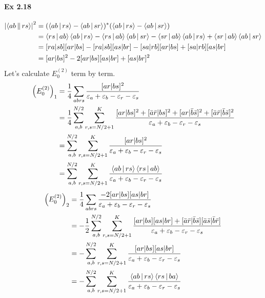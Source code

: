 \documentclass[a4paper]{article}
\newcommand{\ex}[1]{\paragraph{Ex #1}}
\numberwithin{equation}{subsection}
\begin{document}
\ex{2.18}
\begin{equation}\label{key}
\begin{aligned}
\abs{\Braket{ab||rs}}^2 &= (\Braket{ab|rs} - \Braket{ab|sr})^*(\Braket{ab|rs} - \Braket{ab|sr})\\
&= \Braket{rs|ab}\Braket{ab|rs} - \Braket{rs|ab}\Braket{ab|sr} - \Braket{sr|ab}\Braket{ab|rs} + \Braket{sr|ab}\Braket{ab|sr}\\
&= [ra|sb][ar|bs] - [ra|sb][as|br] - [sa|rb][ar|bs] + [sa|rb][as|br]\\
&= [ar|bs]^2 - 2[ar|bs][as|br] + [as|br]^2
\end{aligned}
\end{equation}
Let's calculate $ E_0^{(2)} $ term by term.
\begin{equation}\label{key}
\begin{aligned}
\qty(E_0^{(2)})_1 &= \dfrac{1}{4}\sum_{abrs} \dfrac{[ar|bs]^2}{\varepsilon_a+\varepsilon_b-\varepsilon_r-\varepsilon_s}\\
&= \dfrac{1}{4}\sum_{a,b}^{N/2}\sum_{r,s=N/2+1}^K \dfrac{[ar|bs]^2 +[\bar{a}\bar{r}|bs]^2 + [ar|\bar{b}\bar{s}]^2 +[\bar{a}\bar{r}|\bar{b}\bar{s}]^2}{\varepsilon_a+\varepsilon_b-\varepsilon_r-\varepsilon_s}\\
&= \sum_{a,b}^{N/2}\sum_{r,s=N/2+1}^K \dfrac{[ar|bs]^2}{\varepsilon_a+\varepsilon_b-\varepsilon_r-\varepsilon_s}\\
&= \sum_{a,b}^{N/2}\sum_{r,s=N/2+1}^K \dfrac{\Braket{ab|rs}\Braket{rs|ab}}{\varepsilon_a+\varepsilon_b-\varepsilon_r-\varepsilon_s}
\end{aligned}
\end{equation}
\begin{equation}\label{key}
\begin{aligned}
\qty(E_0^{(2)})_2 &= \dfrac{1}{4}\sum_{abrs} \dfrac{-2[ar|bs][as|br]}{\varepsilon_a+\varepsilon_b-\varepsilon_r-\varepsilon_s}\\
&= -\dfrac{1}{2}\sum_{a,b}^{N/2}\sum_{r,s=N/2+1}^K \dfrac{[ar|bs][as|br] +[\bar{a}\bar{r}|\bar{b}\bar{s}][\bar{a}\bar{s}|\bar{b}\bar{r}]}{\varepsilon_a+\varepsilon_b-\varepsilon_r-\varepsilon_s}\\
&= -\sum_{a,b}^{N/2}\sum_{r,s=N/2+1}^K \dfrac{[ar|bs][as|br]}{\varepsilon_a+\varepsilon_b-\varepsilon_r-\varepsilon_s}\\
&= -\sum_{a,b}^{N/2}\sum_{r,s=N/2+1}^K \dfrac{\Braket{ab|rs}\Braket{rs|ba}}{\varepsilon_a+\varepsilon_b-\varepsilon_r-\varepsilon_s}
\end{aligned}
\end{equation}
\end{document}
